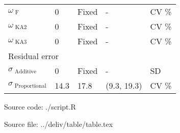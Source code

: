 \documentclass[varwidth, border={10 5 50 5}]{standalone}
\begin{document}
\begin{tabular}{l|l|l|l|l}
 $\omega_{\text{ F}}$                  & 0                & Fixed            & -                                    & CV \%           \\
 $\omega_{\text{ KA2}}$                & 0                & Fixed            & -                                    & CV \%           \\
 $\omega_{\text{ KA3}}$                & 0                & Fixed            & -                                    & CV \%           \\ \hline
\multicolumn{5}{l}{Residual error} \\ \hline
 $\sigma_{\text{ Additive}}$           & 0                & Fixed            & -                                    & SD               \\
 $\sigma_{\text{ Proportional}}$       & 14.3             & 17.8\           & (9.3, 19.3)                          & CV \%           \\ \hline
\end{tabular}
 
{\raggedleft \tiny Source code: ./script.R}
 
\vspace{-5pt}
{\raggedleft \tiny Source file: ../deliv/table/table.tex}
\end{document}
